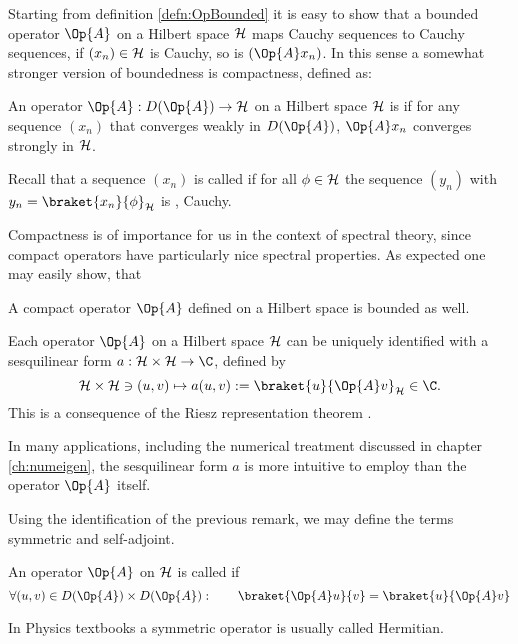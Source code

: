 Starting from definition \ref{defn:OpBounded}
it is easy to show that a bounded operator $\Op{A}$ on a Hilbert
space $\mathcal{H}$ maps Cauchy sequences to Cauchy sequences,
\ie if $(x_n) \in \mathcal{H}$ is Cauchy, so is $(\Op{A} x_n)$.
In this sense a somewhat stronger version of boundedness
is compactness, defined as:
\begin{defn}
	An operator $\Op{A} : D(\Op{A}) \to \hilbert$ on a Hilbert space $\mathcal{H}$
	is 
	if for any sequence $(x_n)$ that converges weakly in $D(\Op{A})$,
	$\Op{A} x_n$ converges strongly in $\mathcal{H}$.

	Recall that a sequence $(x_n)$ is called 
	if for all $\phi \in \mathcal{H}$ the sequence $(y_n)$ with
	$y_n = \braket{x_n}{\phi}_\hilbert$
	is , \ie Cauchy.
\end{defn}
Compactness is of importance for us in the context of spectral theory,
since compact operators have particularly nice spectral properties.
As expected one may easily show, that~\cite{Werner2011}
\begin{prop}
	A compact operator $\Op{A}$ defined on a Hilbert space is bounded as well.
\end{prop}

\begin{rem}
\label{rem:OpRietz}
Each operator $\Op{A}$ on a Hilbert space $\mathcal{H}$ can be
uniquely identified with a sesquilinear form
$a : \hilbert \times \hilbert \to \C$, defined by
\begin{equation}
	\hilbert \times \hilbert \ni (u, v) \mapsto a(u, v) := \braket{u}{\Op{A} v}_\hilbert \in \C.
	\label{eqn:formA}
\end{equation}
This is a consequence of the Riesz representation theorem \cite{DiracNotation}.

In many applications, including the numerical treatment discussed in chapter
\vref{ch:numeigen},
the sesquilinear form $a$ is more intuitive to employ than the operator $\Op{A}$ itself.
\end{rem}

Using the identification of the previous remark,
we may define the terms symmetric and self-adjoint.
\begin{defn}
	\label{def:SymmetricOperator}
	An operator $\Op{A}$ on $\mathcal{H}$ is called 
	if
	\[ \forall (u, v) \in D(\Op{A}) \times D(\Op{A}): \qquad \braket{\Op{A} u}{v} = \braket{u}{\Op{A} v} \]
\end{defn}
In Physics textbooks a symmetric operator is usually called Hermitian.

